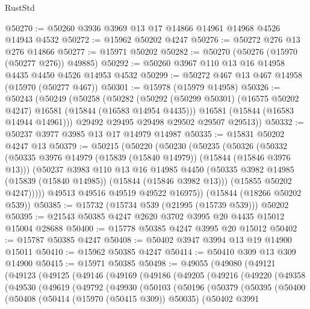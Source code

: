 \begin{lexlean}{RustStd}
\begin{coremodule}
@50270 := @50260 @3936 @3969 @13 @17 @14866 @14961 @14968 @4526 @14943 @4532
@50272 := @15962 @50202 @4247
@50276 := @50272 @276 @13 @276 @14866
@50277 := @15971 @50202
@50282 := @50270 (@50276 (@15970 (@50277 @276)) @49885)
@50292 := @50260 @3967 @110 @13 @16 @14958 @4435 @4450 @4526 @14953 @4532
@50299 := @50272 @467 @13 @467 @14958 (@15970 (@50277 @467))
@50301 := @15978 (@15979 @14958)
@50326 := @50243
    (@50249
      (@50258
        (@50282
          (@50292 (@50299 @50301) (@16575 @50202 @4247) @16581 (@15844 (@16583 @14954 @4435)))
          @16581
          (@15844 (@16583 @14944 @14961)))
        @29492
        @29495
        @29498
        @29502
        @29507
        @29513))
@50332 := @50237 @3977 @3985 @13 @17 @14979 @14987
@50335 := @15831 @50202 @4247 @13
@50379 := @50215
    (@50220
      (@50230
        (@50235
          (@50326
            (@50332
              (@50335 @3976 @14979 (@15839 (@15840 @14979)) (@15844 (@15846 @3976 @13)))
              (@50237
                @3983
                @110
                @13
                @16
                @14985
                @4450
                (@50335 @3982 @14985 (@15839 (@15840 @14985)) (@15844 (@15846 @3982 @13)))
                (@15855 @50202 @4247)))))
        @49513
        @49516
        @49519
        @49522
        @16975))
    (@15844 (@18266 @50202 @539))
@50385 := @15732 (@15734 @539 (@21995 (@15739 @539))) @50202
@50395 := @21543 @50385 @4247 @2620 @3702 @3995 @20 @4435 @15012 @15004 @28688
@50400 := @15778 @50385 @4247 @3995 @20 @15012
@50402 := @15787 @50385 @4247
@50408 := @50402 @3947 @3994 @13 @19 @14900 @15011
@50410 := @15962 @50385 @4247
@50414 := @50410 @309 @13 @309 @14900
@50415 := @15971 @50385
@50498 := @49055
    (@49080
      (@49121
        (@49123
          (@49125
            (@49146
              (@49169
                (@49186
                  (@49205
                    (@49216
                      (@49220
                        (@49358
                          (@49530
                            (@49619
                              (@49792
                                (@49930
                                  (@50103
                                    (@50196
                                      (@50379
                                        (@50395
                                          (@50400
                                            (@50408
                                              (@50414 (@15970 (@50415 @309)) @50035)
                                              (@50402
                                                @3991

\end{coremodule}
\end{lexlean}
